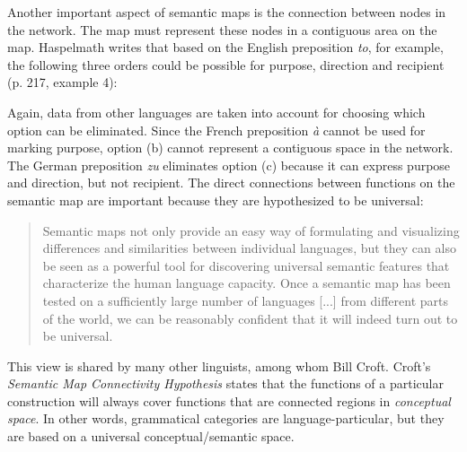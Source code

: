 Another important aspect of semantic maps is the connection between nodes in the network. The map must represent these nodes in a contiguous area on the map. Haspelmath writes that based on the English preposition {\em to}, for example, the following three orders could be possible for purpose, direction and recipient (p. 217, example 4):

\eal
{}
\zl

Again, data from other languages are taken into account for choosing which option can be eliminated. Since the French preposition {\em à} cannot be used for marking purpose, option (b) cannot represent a contiguous space in the network. The German preposition {\em zu} eliminates option (c) because it can express purpose and direction, but not recipient. The direct connections between functions on the semantic map are important because they are hypothesized to be universal:

\begin{quote}
Semantic maps not only provide an easy way of formulating and visualizing differences and similarities between individual languages, but they can also be seen as a powerful tool for discovering universal semantic features that characterize the human language capacity. Once a semantic map has been tested on a sufficiently large number of languages [...] from different parts of the world, we can be reasonably confident that it will indeed turn out to be universal. \citep[p. 232]{haspelmath03geometry} 
\end{quote}

This view is shared by many other linguists, among whom Bill Croft. Croft's {\em Semantic Map Connectivity Hypothesis} \citep[p. 96]{croft01radical} states that the functions of a particular construction will always cover functions that are connected regions in {\em conceptual space}. In other words, grammatical categories are language-particular, but they are based on a universal conceptual/semantic space.

